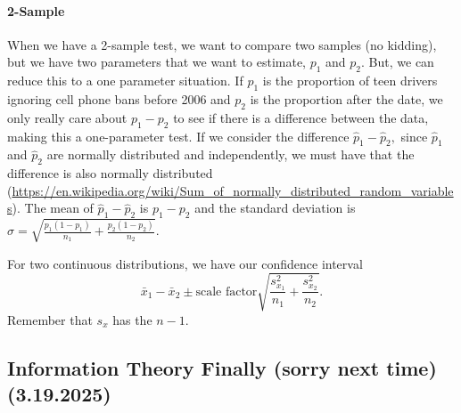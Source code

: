 \documentclass[12pt]{article}
\theoremstyle{remark}
\begin{document}
\paragraph{2-Sample}
When we have a 2-sample test, we want to compare two samples (no kidding), but we have two parameters that we want to estimate, $p_1$ and $p_2.$ But, we can reduce this to a one parameter situation. If $p_1$ is the proportion of teen drivers ignoring cell phone bans before 2006 and $p_2$ is the proportion after the date, we only really care about $p_1-p_2$ to see if there is a difference between the data, making this a one-parameter test. If we consider the difference $\hat p_1-\hat p_2,$ since $\hat p_1$ and $\hat p_2$ are normally distributed and independently, we must have that the difference is also normally distributed (\url{https://en.wikipedia.org/wiki/Sum_of_normally_distributed_random_variables}).
The mean of $\hat p_1-\hat p_2$ is $p_1-p_2$ and the standard deviation is $\sigma=\sqrt{\frac{p_1(1-p_1)}{n_1}+\frac{p_2(1-p_2)}{n_2}}.$

For two continuous distributions, we have our confidence interval
\[\bar{x}_1-\bar{x}_2\pm\text{scale factor}\sqrt{\frac{s_{x_1}^2}{n_1}+\frac{s_{x_2}^2}{n_2}}.\] Remember that $s_x$ has the $n-1.$

\subsection{Information Theory Finally (sorry next time) (3.19.2025)}
\end{document}
